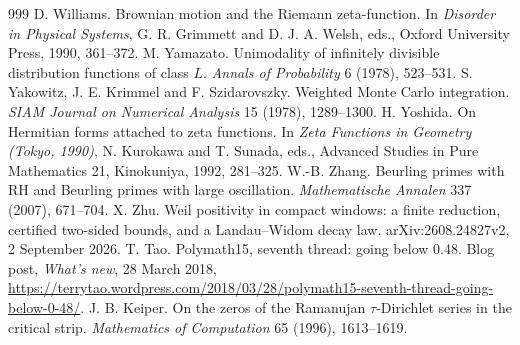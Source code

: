 \begin{thebibliography}{999}
 D. Williams. Brownian motion and the Riemann zeta-function. In \emph{Disorder in Physical Systems}, G. R. Grimmett and D. J. A. Welsh, eds., Oxford University Press, 1990, 361--372.
 M. Yamazato. Unimodality of infinitely divisible distribution functions of class $L$. \emph{Annals of Probability} 6 (1978), 523--531.
 S. Yakowitz, J. E. Krimmel and F. Szidarovszky. Weighted Monte Carlo integration. \emph{SIAM Journal on Numerical Analysis} 15 (1978), 1289--1300.
 H. Yoshida. On Hermitian forms attached to zeta functions. In \emph{Zeta Functions in Geometry (Tokyo, 1990)}, N. Kurokawa and T. Sunada, eds., Advanced Studies in Pure Mathematics 21, Kinokuniya, 1992, 281--325.
 W.-B. Zhang. Beurling primes with RH and Beurling primes with large oscillation. \emph{Mathematische Annalen} 337 (2007), 671--704.
 X. Zhu. Weil positivity in compact windows: a finite reduction, certified two-sided bounds, and a Landau--Widom decay law. arXiv:2608.24827v2, 2 September 2026.
 T. Tao. Polymath15, seventh thread: going below 0.48. Blog post, \emph{What's new}, 28 March 2018, \url{https://terrytao.wordpress.com/2018/03/28/polymath15-seventh-thread-going-below-0-48/}. %
 J. B. Keiper. On the zeros of the Ramanujan $\tau$-Dirichlet series in the critical strip. \emph{Mathematics of Computation} 65 (1996), 1613--1619. %

\end{thebibliography}
